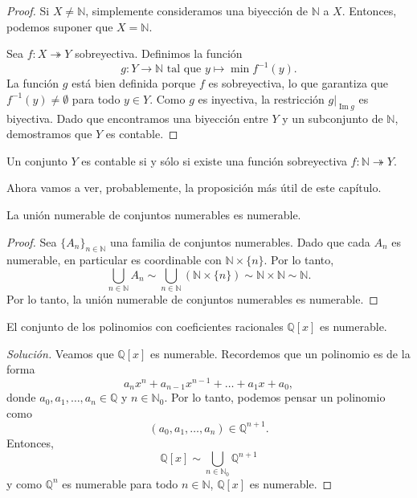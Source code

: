 \begin{proof}
	Si $X \neq \mathbb{N}$, simplemente consideramos una biyección de $\mathbb{N}$ a $X$. Entonces, podemos suponer que $X = \mathbb{N}$.

	Sea $f: X \twoheadrightarrow Y$ sobreyectiva. Definimos la función
	\begin{equation*}
		g: Y \to \mathbb{N} \text{ tal que } y \mapsto \min f^{-1}(y).
	\end{equation*}
	La función $g$ está bien definida porque $f$ es sobreyectiva, lo que garantiza que $f^{-1}(y) \neq \emptyset$ para todo $y \in Y$. Como $g$ es inyectiva, la restricción $g|_{\operatorname{Im}g}$ es biyectiva. Dado que encontramos una biyección entre $Y$ y un subconjunto de $\mathbb{N}$, demostramos que $Y$ es contable.
\end{proof}

\begin{remark}
	Un conjunto $Y$ es contable si y sólo si existe una función sobreyectiva $f : \mathbb{N} \twoheadrightarrow Y$.
\end{remark}

Ahora vamos a ver, probablemente, la proposición más útil de este capítulo.

\begin{proposition}
	La unión numerable de conjuntos numerables es numerable.
\end{proposition}

\begin{proof}
	Sea $\{ A_{n} \}_{n \in \mathbb{N}}$ una familia de conjuntos numerables. Dado que cada $A_n$ es numerable, en particular es coordinable con $\mathbb{N} \times \{ n \}$. Por lo tanto,
	\begin{equation*}
		\bigcup_{n \in \mathbb{N}} A_n \sim \bigcup_{n \in \mathbb{N}} (\mathbb{N} \times \{ n \}) \sim \mathbb{N} \times \mathbb{N} \sim \mathbb{N}.
	\end{equation*}
	Por lo tanto, la unión numerable de conjuntos numerables es numerable.
\end{proof}

\begin{example}
	El conjunto de los polinomios con coeficientes racionales $\mathbb{Q}[x]$ es numerable.
\end{example}

\begin{proof}[Solución]
	Veamos que $\mathbb{Q}[x]$ es numerable. Recordemos que un polinomio es de la forma
	\begin{equation*}
		a_{n} x^n + a_{n-1} x^{n-1} + \dots + a_{1} x + a_0,
	\end{equation*}
	donde $a_0, a_1, \ldots, a_n \in \mathbb{Q}$ y $n \in \mathbb{N}_0$. Por lo tanto, podemos pensar un polinomio como
	\begin{equation*}
		(a_0, a_1, \ldots, a_n) \in \mathbb{Q}^{n+1}.
	\end{equation*}
	Entonces,
	\begin{equation*}
		\mathbb{Q}[x] \sim \bigcup_{n \in \mathbb{N}_0} \mathbb{Q}^{n+1}
	\end{equation*}
	y como $\mathbb{Q}^n$ es numerable para todo $n \in \mathbb{N}$, $\mathbb{Q}[x]$ es numerable.
\end{proof}

